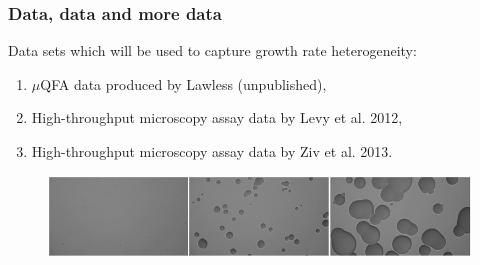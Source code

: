 \documentclass{beamer}
\begin{document}
\begin{frame}
\frametitle{Data, data and more data}
Data sets which will be used to capture growth rate heterogeneity: 
\begin{enumerate}
\item $\mu$QFA data produced by Lawless (unpublished),
\item High-throughput microscopy assay data by Levy et al. 2012,
\item High-throughput microscopy assay data by Ziv et al. 2013.
\end{enumerate}
\vspace{+1em}
\begin{figure}
\includegraphics[width=1\linewidth]{CellGrowth3Pic.png}
\end{figure}
\end{frame}
\end{document}
